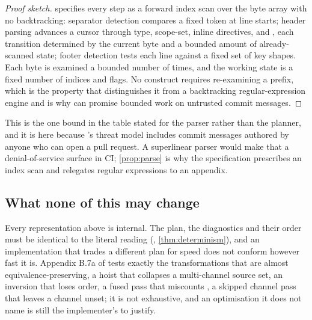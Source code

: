 \begin{proof}[Proof sketch]
 specifies every step as a forward index scan over the byte array with
no backtracking: separator detection compares a fixed token at line starts;
header parsing advances a cursor through type, scope-set, inline directives,
\code{!} and \code{:~}, each transition determined by the current byte and a
bounded amount of already-scanned state; footer detection tests each line
against a fixed set of key shapes. Each byte is examined a bounded number of
times, and the working state is a fixed number of indices and flags. No
construct requires re-examining a prefix, which is the property that
distinguishes it from a backtracking regular-expression engine and is why
 can promise bounded work on untrusted commit messages.
\end{proof}

This is the one bound in the table stated for the parser rather than the
planner, and it is here because 's threat model includes commit
messages authored by anyone who can open a pull request. A superlinear parser
would make that a denial-of-service surface in CI; \cref{prop:parse} is why the
specification prescribes an index scan and relegates regular expressions to an
appendix.

\subsection{What none of this may change}

Every representation above is internal. The plan, the diagnostics and their
order must be identical to the literal reading (,
\cref{thm:determinism}), and an implementation that trades a different plan
for speed does not conform however fast it is. Appendix B.7a of \SPEC{} tests
exactly the transformations that are almost equivalence-preserving, a hoist
that collapses a multi-channel source set, an inversion that loses
 order, a fused pass that miscounts , a skipped channel
pass that leaves a channel unset; it is not exhaustive, and an optimisation it
does not name is still the implementer's to justify.
